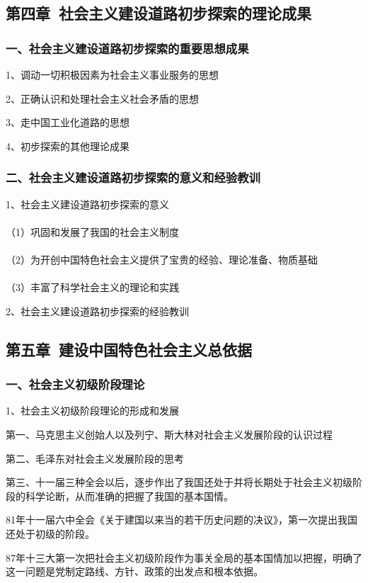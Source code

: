 \documentclass{ctexart}
\begin{document}
\subsection{第四章\ 社会主义建设道路初步探索的理论成果}
\subsubsection{一、社会主义建设道路初步探索的重要思想成果}
1、调动一切积极因素为社会主义事业服务的思想

2、正确认识和处理社会主义社会矛盾的思想

3、走中国工业化道路的思想

4、初步探索的其他理论成果

\subsubsection{二、社会主义建设道路初步探索的意义和经验教训}
1、社会主义建设道路初步探索的意义
\\\\
（1）巩固和发展了我国的社会主义制度
\\\\
（2）为开创中国特色社会主义提供了宝贵的经验、理论准备、物质基础
\\\\
（3）丰富了科学社会主义的理论和实践

2、社会主义建设道路初步探索的经验教训

\subsection{第五章\ 建设中国特色社会主义总依据}
\subsubsection{一、社会主义初级阶段理论}
1、社会主义初级阶段理论的形成和发展

第一、马克思主义创始人以及列宁、斯大林对社会主义发展阶段的认识过程

第二、毛泽东对社会主义发展阶段的思考

第三、十一届三种全会以后，逐步作出了我国还处于并将长期处于社会主义初级阶段的科学论断，从而准确的把握了我国的基本国情。

81年十一届六中全会《关于建国以来当的若干历史问题的决议》，第一次提出我国还处于初级的阶段。

87年十三大第一次把社会主义初级阶段作为事关全局的基本国情加以把握，明确了这一问题是党制定路线、方针、政策的出发点和根本依据。
\end{document}
